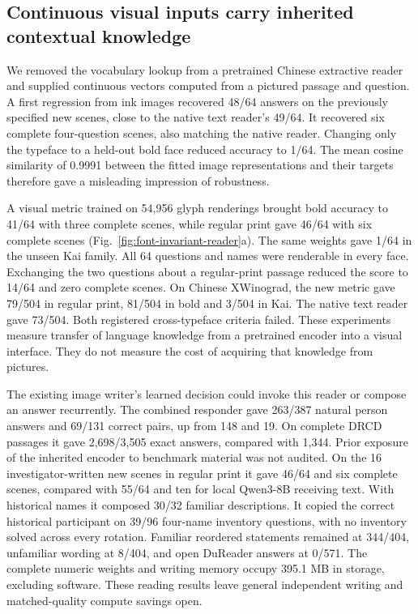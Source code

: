 \subsection*{Continuous visual inputs carry inherited contextual knowledge}
We removed the vocabulary lookup from a pretrained Chinese extractive reader and supplied continuous vectors computed from a pictured passage and question. A first regression from ink images recovered 48/64 answers on the previously specified new scenes, close to the native text reader's 49/64. It recovered six complete four-question scenes, also matching the native reader. Changing only the typeface to a held-out bold face reduced accuracy to 1/64. The mean cosine similarity of 0.9991 between the fitted image representations and their targets therefore gave a misleading impression of robustness.

A visual metric trained on 54,956 glyph renderings brought bold accuracy to 41/64 with three complete scenes, while regular print gave 46/64 with six complete scenes (Fig.~\ref{fig:font-invariant-reader}a). The same weights gave 1/64 in the unseen Kai family. All 64 questions and names were renderable in every face. Exchanging the two questions about a regular-print passage reduced the score to 14/64 and zero complete scenes. On Chinese XWinograd, the new metric gave 79/504 in regular print, 81/504 in bold and 3/504 in Kai. The native text reader gave 73/504. Both registered cross-typeface criteria failed. These experiments measure transfer of language knowledge from a pretrained encoder into a visual interface. They do not measure the cost of acquiring that knowledge from pictures.

The existing image writer's learned decision could invoke this reader or compose an answer recurrently. The combined responder gave 263/387 natural person answers and 69/131 correct pairs, up from 148 and 19. On complete DRCD passages it gave 2,698/3,505 exact answers, compared with 1,344. Prior exposure of the inherited encoder to benchmark material was not audited. On the 16 investigator-written new scenes in regular print it gave 46/64 and six complete scenes, compared with 55/64 and ten for local Qwen3-8B receiving text. With historical names it composed 30/32 familiar descriptions. It copied the correct historical participant on 39/96 four-name inventory questions, with no inventory solved across every rotation. Familiar reordered statements remained at 344/404, unfamiliar wording at 8/404, and open DuReader answers at 0/571. The complete numeric weights and writing memory occupy 395.1 MB in storage, excluding software. These reading results leave general independent writing and matched-quality compute savings open.
